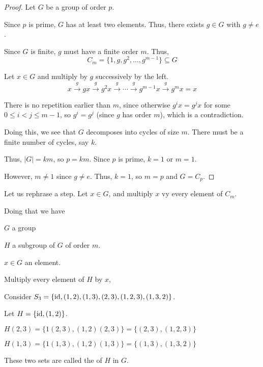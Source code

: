 \begin{proof}
    Let $G$ be a group of order $p$. 
    
    Since $p$ is prime, $G$ has at least two elements. Thus, there exists $g \in G$ with $g \neq e$. 

    Since $G$ is finite, $g$ must have a finite order $m$. Thus, \[
        C_m = \{ 1, g, g^2, \dots, g^{m - 1} \} \subseteq G
    \]

    Let $x \in G$ and multiply by $g$ successively by the left. \[
        x \xrightarrow{g} gx \xrightarrow{g} g^2x \xrightarrow{g} \cdots \xrightarrow{g} g^{m - 1}x \xrightarrow{g} g^mx = x
    \]

    There is no repetition earlier than $m$, since otherwise $g^ix = g^jx$ for some $0 \le i < j \le m - 1$, so $g^i = g^j$ (since $g$ has order $m$), which is a contradiction.

    Doing this, we see that $G$ decomposes into cycles of size $m$. There must be a finite number of cycles, say $k$. 

    Thus, $|G| = km$, so $p = km$. Since $p$ is prime, $k = 1$ or $m = 1$.

    However, $m \neq 1$ since $g \neq e$. Thus, $k = 1$, so $m = p$ and $G = C_p$.
\end{proof}

Let us rephrase a step. Let $x \in G$, and multiply $x$ vy every element of $C_m$. 

Doing that we have
\begin{listu}
    \item $G$ a group 
    \item $H$ a subgroup of $G$ of order $m$.
    \item $x \in G$ an element. 
\end{listu}

Multiply every element of $H$ by $x$, 

\begin{example}
    Consider $S_3 = \{ \mathrm{id}, (1, 2), (1, 3), (2, 3), (1, 2, 3), (1, 3, 2) \}$.

    Let $H = \{ \mathrm{id}, (1, 2) \}$.

    \begin{listu}
        \item $H(2, 3) = \{ 1 (2, 3), (1, 2)(2, 3) \} = \{ (2, 3), (1, 2, 3) \}$
        \item $H(1, 3) = \{ 1 (1, 3), (1, 2)(1, 3) \} = \{ (1, 3), (1, 3, 2) \}$
    \end{listu}

    These two sets are called the  of $H$ in $G$.
\end{example}

